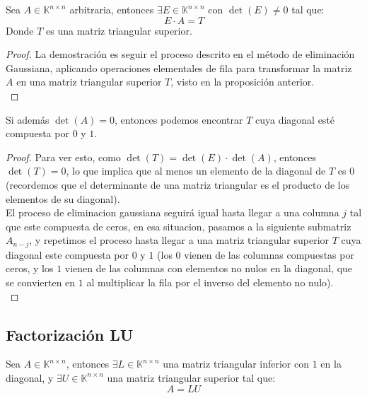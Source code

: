 \begin{teorema}
    Sea $A \in \mathbb{K}^{n \times n}$ arbitraria, entonces $\exists E \in \mathbb{K}^{n \times n}$ con $\det(E) \neq 0$ tal que:
    \[
        E \cdot A = T
    \]
    Donde $T$ es una matriz triangular superior.
\end{teorema}

\begin{proof}
    La demostración es seguir el proceso descrito en el método de eliminación Gaussiana, aplicando operaciones elementales de fila para transformar la matriz $A$ en una matriz triangular superior $T$, visto en la proposición anterior.\\
\end{proof}

\begin{observación}
    Si además $\det(A) = 0$, entonces podemos encontrar $T$ cuya diagonal esté compuesta por $0$ y $1$.
\end{observación}

\begin{proof}
    Para ver esto, como $\det(T) = \det(E) \cdot \det(A)$, entonces $\det(T) = 0$, lo que implica que al menos un elemento de la diagonal de $T$ es $0$ (recordemos que el determinante de una matriz triangular es el producto de los elementos de su diagonal).\\
    El proceso de eliminacion gaussiana seguirá igual hasta llegar a una columna $j$ tal que este compuesta de ceros, en esa situacion, pasamos a la siguiente submatriz $A_{n-j}$, y repetimos el proceso hasta llegar a una matriz triangular superior $T$ cuya diagonal este compuesta por $0$ y $1$ (los $0$ vienen de las columnas compuestas por ceros, y los $1$ vienen de las columnas con elementos no nulos en la diagonal, que se convierten en $1$ al multiplicar la fila por el inverso del elemento no nulo).\\
\end{proof}

\subsection{Factorización LU}

\begin{teorema}[Factorización LU]
    Sea $A \in \mathbb{K}^{n \times n}$, entonces $\exists L \in \mathbb{K}^{n \times n}$ una matriz triangular inferior con $1$ en la diagonal, y $\exists U \in \mathbb{K}^{n \times n}$ una matriz triangular superior tal que:
    \[
        A = LU
    \]
\end{teorema}

